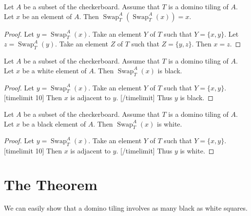 \documentclass{article}
\newcommand{\Sw}[3]{\operatorname{Swap}_{#1}^{#2}(#3)}
\begin{document}
\begin{forthel}
    \begin{lemma}
        Let $A$ be a subset of the checkerboard.
        Assume that $T$ is a domino tiling of $A$.
        Let $x$ be an element of $A$.
        Then $\Sw{T}{A}{\Sw{T}{A}{x}} = x$.
    \end{lemma}
    \begin{proof}
        Let $y = \Sw{T}{A}{x}$.
        Take an element $Y$ of $T$ such that $Y = \{x, y\}$.
        Let $z = \Sw{T}{A}{y}$.
        Take an element $Z$ of $T$ such that $Z = \{y, z\}$.
        Then $x = z$.
    \end{proof}

    \begin{lemma}
        Let $A$ be a subset of the checkerboard.
        Assume that $T$ is a domino tiling of $A$.
        Let $x$ be a white element of $A$.
        Then $\Sw{T}{A}{x}$ is black.
    \end{lemma}
    \begin{proof}
        Let $y = \Sw{T}{A}{x}$.
        Take an element $Y$ of $T$ such that $Y = \{x,y\}$.
        [timelimit 10]
        Then $x$ is adjacent to $y$. 
        [/timelimit]
        Thus $y$ is black.
    \end{proof}

    \begin{lemma}
        Let $A$ be a subset of the checkerboard.
        Assume that $T$ is a domino tiling of $A$.
        Let $x$ be a black element of $A$.
        Then $\Sw{T}{A}{x}$ is white.
    \end{lemma}
    \begin{proof}
        Let $y = \Sw{T}{A}{x}$.
        Take an element $Y$ of $T$ such that $Y = \{x,y\}$.
        [timelimit 10]
        Then $x$ is adjacent to $y$. 
        [/timelimit]
        Thus $y$ is white.
    \end{proof}
\end{forthel}

\section{The Theorem}

\noindent We can easily show that a domino tiling involves as many black as white squares.
\end{document}
